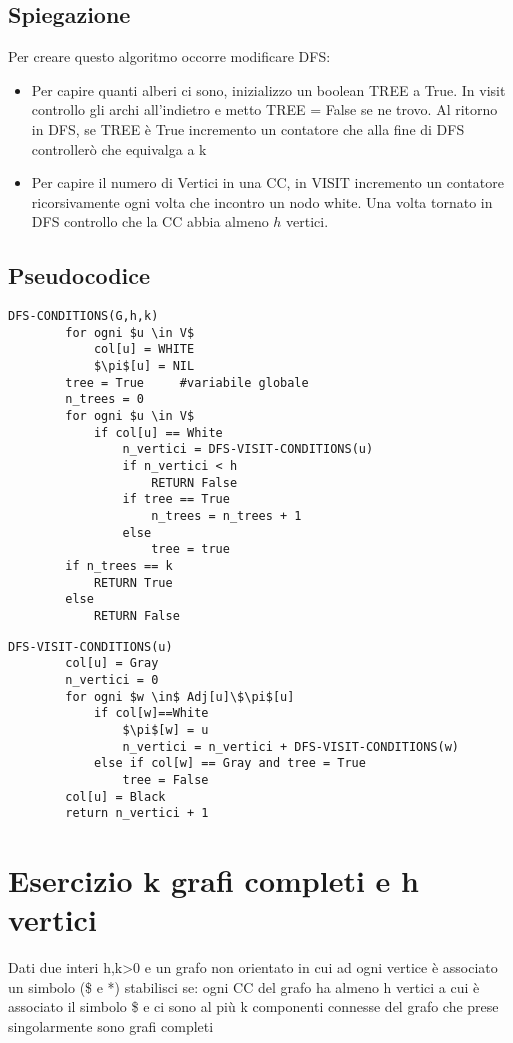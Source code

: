 \documentclass[12pt, a4paper, openany]{book}
\begin{document}
	\subsection*{Spiegazione}
	Per creare questo algoritmo occorre modificare DFS:
	\begin{itemize}
		\item Per capire quanti alberi ci sono, inizializzo un boolean TREE a True. In visit controllo gli archi all'indietro e metto TREE = False se ne trovo. Al ritorno in DFS, se TREE è True incremento un contatore che alla fine di DFS controllerò che equivalga a k
		\item Per capire il numero di Vertici in una CC, in VISIT incremento un contatore ricorsivamente ogni volta che incontro un nodo white. Una volta tornato in DFS controllo che la CC abbia almeno $h$ vertici.
	\end{itemize}

	\subsection*{Pseudocodice}
	\begin{lstlisting}[mathescape=true]
    DFS-CONDITIONS(G,h,k)
        for ogni $u \in V$
            col[u] = WHITE
            $\pi$[u] = NIL
        tree = True     #variabile globale
        n_trees = 0
        for ogni $u \in V$
            if col[u] == White
                n_vertici = DFS-VISIT-CONDITIONS(u)
                if n_vertici < h
                    RETURN False
                if tree == True
                    n_trees = n_trees + 1
                else
                    tree = true
        if n_trees == k
            RETURN True
        else
            RETURN False
\end{lstlisting}

	\begin{lstlisting}[mathescape=true]
    DFS-VISIT-CONDITIONS(u)
        col[u] = Gray
        n_vertici = 0
        for ogni $w \in$ Adj[u]\$\pi$[u]
            if col[w]==White
                $\pi$[w] = u
                n_vertici = n_vertici + DFS-VISIT-CONDITIONS(w)
            else if col[w] == Gray and tree = True
                tree = False
        col[u] = Black
        return n_vertici + 1
\end{lstlisting}

	\section{Esercizio k grafi completi e h vertici}
	Dati due interi h,k>0 e un grafo non orientato  in cui ad ogni vertice è associato un simbolo (\$ e *)
	stabilisci se: ogni CC del grafo ha almeno h vertici a cui è associato il simbolo \$
	e ci sono al più k componenti connesse del grafo che prese singolarmente sono grafi completi
\end{document}
